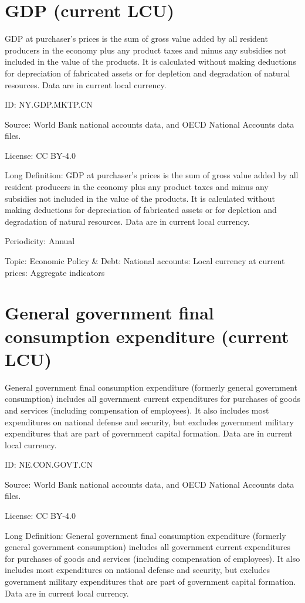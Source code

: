\documentclass[a4paper]{article}
\begin{document}
\section{GDP (current LCU)}
GDP at purchaser's prices is the sum of gross value added by all resident producers in the economy plus any product taxes and minus any subsidies not included in the value of the products. It is calculated without making deductions for depreciation of fabricated assets or for depletion and degradation of natural resources. Data are in current local currency.

ID: NY.GDP.MKTP.CN

Source: World Bank national accounts data, and OECD National Accounts data files.

License:  CC BY-4.0 

Long Definition: GDP at purchaser's prices is the sum of gross value added by all resident producers in the economy plus any product taxes and minus any subsidies not included in the value of the products. It is calculated without making deductions for depreciation of fabricated assets or for depletion and degradation of natural resources. Data are in current local currency.

Periodicity: Annual

Topic: Economic Policy \& Debt: National accounts: Local currency at current prices: Aggregate indicators

\section{General government final consumption expenditure (current LCU)}

General government final consumption expenditure (formerly general government consumption) includes all government current expenditures for purchases of goods and services (including compensation of employees). It also includes most expenditures on national defense and security, but excludes government military expenditures that are part of government capital formation. Data are in current local currency.

ID: NE.CON.GOVT.CN

Source: World Bank national accounts data, and OECD National Accounts data files.

License:  CC BY-4.0 

Long Definition: General government final consumption expenditure (formerly general government consumption) includes all government current expenditures for purchases of goods and services (including compensation of employees). It also includes most expenditures on national defense and security, but excludes government military expenditures that are part of government capital formation. Data are in current local currency.
\end{document}
